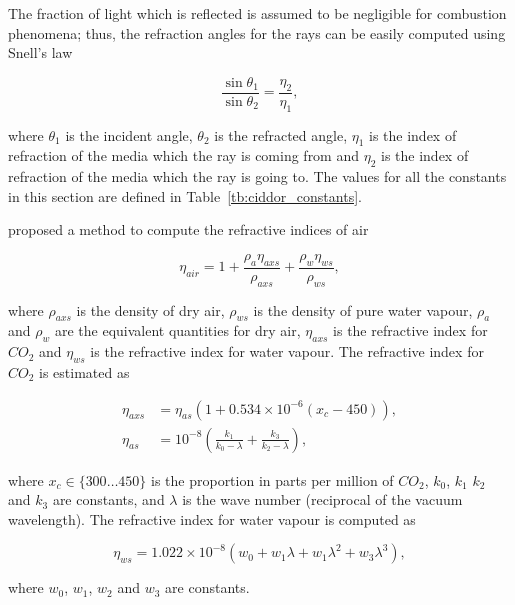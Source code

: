 The fraction of light which is reflected is assumed to be negligible for combustion phenomena; thus, the refraction angles for the rays can be easily computed using Snell's law

\begin{equation}
\frac{\sin \theta_1}{\sin \theta_2} = \frac{\eta_2}{\eta_1},
\end{equation}

where $\theta_1$ is the incident angle, $\theta_2$ is the refracted angle, $\eta_1$ is the index of refraction of the media which the ray is coming from and $\eta_2$ is the index of refraction of the media which the ray is going to.
The values for all the constants in this section are defined in Table~\ref{tb:ciddor_constants}.

\cite{Ciddor:1996} proposed a method to compute the refractive indices of air 

\begin{equation}
\label{eq:ciddor_eta_air}
\eta_{air} = 1 + \frac{\rho_a \eta_{axs}}{\rho_{axs}} + \frac{\rho_w \eta_{ws}}{\rho_{ws}},
\end{equation}

where $\rho_{axs}$ is the density of dry air, $\rho_{ws}$ is the density of pure water vapour, $\rho_{a}$ and $\rho_{w}$ are the equivalent quantities for dry air, $\eta_{axs}$ is the refractive index for $CO_2$ and $\eta_{ws}$ is the refractive index for water vapour.
The refractive index for $CO_2$ is estimated as

\begin{align}
\label{eq:ciddor_eta_axs}
\eta_{axs} &= \eta_{as} \left(1 + 0.534 \times 10^{-6} \left(x_c - 450 \right) \right), \\
\label{eq:ciddor_eta_as}
\eta_{as} &= 10^{-8} \left( \frac{k_1}{k_0 - \lambda} + \frac{k_3}{k_2 - \lambda} \right),
\end{align}

where $x_c \in \lbrace 300 \ldots 450 \rbrace $ is the proportion in parts per million of $CO_2$, $k_0$, $k_1$ $k_2$ and $k_3$ are constants, and $\lambda$ is the wave number (reciprocal of the vacuum wavelength).
The refractive index for water vapour is computed as

\begin{equation}
\label{eq:ciddor_eta_ws}
\eta_{ws} = 1.022 \times 10^{-8} \left( w_0 + w_1 \lambda + w_1 \lambda^2 + w_3 \lambda^3 \right),
\end{equation}

where $w_0$, $w_1$, $w_2$ and $w_3$ are constants.

